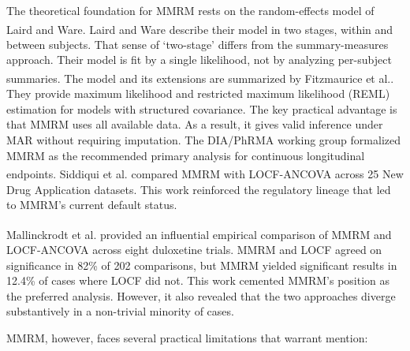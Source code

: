 \documentclass[
  11pt,
]{article}
\begin{document}
The theoretical foundation for MMRM rests on the
random-effects model of Laird and Ware\textsuperscript{}. Laird
and Ware describe their model in two stages, within and
between subjects. That sense of `two-stage' differs from the
summary-measures approach. Their model is fit by a single
likelihood, not by analyzing per-subject summaries. The model
and its extensions are summarized by
Fitzmaurice et al.\textsuperscript{}. They provide
maximum likelihood and restricted maximum likelihood (REML)
estimation for models with structured covariance. The
key practical advantage is that MMRM uses all available data.
As a result, it gives valid inference under MAR without
requiring imputation. The DIA/PhRMA working group formalized
MMRM as the recommended primary analysis for continuous
longitudinal endpoints\textsuperscript{}.
Siddiqui et al.\textsuperscript{} compared MMRM with
LOCF-ANCOVA across 25 New Drug Application datasets. This work
reinforced the regulatory lineage that led to MMRM's current
default status.

Mallinckrodt et al.\textsuperscript{} provided an
influential empirical comparison of MMRM and LOCF-ANCOVA across eight
duloxetine trials. MMRM and LOCF agreed on significance in 82\% of 202
comparisons, but MMRM yielded significant results in 12.4\% of cases
where LOCF did not. This work cemented MMRM's position as the preferred
analysis. However, it also revealed that the two approaches diverge
substantively in a non-trivial minority of cases.

MMRM, however, faces several practical limitations that
warrant mention:
\end{document}
